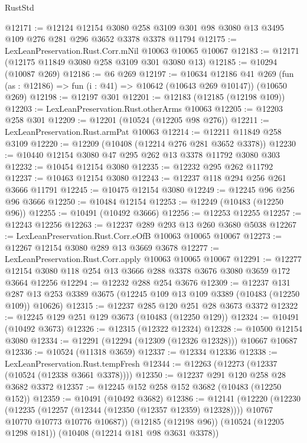 \begin{lexlean}{RustStd}
\begin{coremodule}
@12171 := @12124
    @12154
    @3080
    @258
    @3109
    @301
    @98
    @3080
    @13
    @3495
    @109
    @276
    @281
    @296
    @3652
    @3378
    @3378
    @11794
@12175 := LexLeanPreservation.Rust.Corr.mNil @10063 @10065 @10067
@12183 := @12171 (@12175 @11849 @3080 @258 @3109 @301 @3080 @13)
@12185 := @10294 (@10087 @269)
@12186 := @6 @269
@12197 := @10634
    @12186
    @41
    @269
    (fun (as : @12186) => fun (i : @41) => @10642 (@10643 @269 @10147))
    (@10650 @269)
@12198 := @12197 @301
@12201 := @12183 (@12185 (@12198 @109))
@12203 := LexLeanPreservation.Rust.otherArms @10063
@12205 := @12203 @258 @301
@12209 := @12201 (@10524 (@12205 @98 @276))
@12211 := LexLeanPreservation.Rust.armPat @10063
@12214 := @12211 @11849 @258 @3109
@12220 := @12209 (@10408 (@12214 @276 @281 @3652 @3378))
@12230 := @10440 @12154 @3080 @47 @295 @262 @13 @3378 @11792 @3080 @303
@12232 := @10454 @12154 @3080
@12235 := @12232 @295 @262 @11792
@12237 := @10463 @12154 @3080
@12243 := @12237 @118 @294 @256 @261 @3666 @11791
@12245 := @10475 @12154 @3080
@12249 := @12245 @96 @256 @96 @3666
@12250 := @10484 @12154
@12253 := @12249 (@10483 (@12250 @96))
@12255 := @10491 (@10492 @3666)
@12256 := @12253 @12255
@12257 := @12243 @12256
@12263 := @12237 @289 @293 @13 @260 @3680 @5038
@12267 := LexLeanPreservation.Rust.Corr.eOfB @10063 @10065 @10067
@12273 := @12267 @12154 @3080 @289 @13 @3669 @3678
@12277 := LexLeanPreservation.Rust.Corr.apply @10063 @10065 @10067
@12291 := @12277 @12154 @3080 @118 @254 @13 @3666 @288 @3378 @3676 @3080 @3659 @172 @3664 @12256
@12294 := @12232 @288 @254 @3676
@12309 := @12237
    @131
    @287
    @13
    @253
    @3389
    @3675
    (@12245 @109 @13 @109 @3389 (@10483 (@12250 @109)) @10626)
@12315 := @12237 @285 @120 @251 @28 @3673 @3372
@12322 := @12245 @129 @251 @129 @3673 (@10483 (@12250 @129))
@12324 := @10491 (@10492 @3673)
@12326 := @12315 (@12322 @12324)
@12328 := @10500 @12154 @3080
@12334 := @12291 (@12294 (@12309 (@12326 @12328))) @10667 @10687
@12336 := @10524 (@11318 @3659)
@12337 := @12334 @12336
@12338 := LexLeanPreservation.Rust.tempFresh
@12344 := @12263 (@12273 (@12337 (@10524 (@12338 @3661 @3378))))
@12350 := @12237 @291 @120 @258 @28 @3682 @3372
@12357 := @12245 @152 @258 @152 @3682 (@10483 (@12250 @152))
@12359 := @10491 (@10492 @3682)
@12386 := @12141
    (@12220
      (@12230
        (@12235 (@12257 (@12344 (@12350 (@12357 @12359) @12328))))
        @10767
        @10770
        @10773
        @10776
        @10687))
    (@12185 (@12198 @96))
    (@10524 (@12205 @1298 @181))
    (@10408 (@12214 @181 @98 @3631 @3378))

\end{coremodule}
\end{lexlean}

